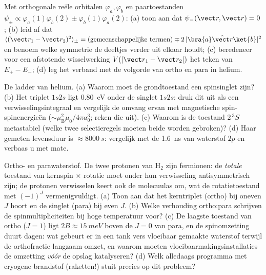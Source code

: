 \begin{exercise}[$\star\star$]\label{exo:b3:identical-particles:6}
Met orthogonale reële orbitalen $\varphi_a, \varphi_b$ en paartoestanden
$\psi_\pm \propto \varphi_a(1)\varphi_b(2) \pm
\varphi_b(1)\varphi_a(2)$: (a) toon aan dat $\psi_-(\vect r, \vect r) = 0$; (b) leid af dat $\langle(\vect r_1 - \vect r_2)^2\rangle_\pm =
(\text{gemeenschappelijke termen}) \mp 2\,|\bra{a}\hat{\vect r}\ket{b}|^2$
en benoem welke symmetrie de deeltjes verder uit elkaar houdt; (c)
beredeneer voor een afstotende wisselwerking $V(|\vect r_1 - \vect r_2|)$
het teken van $E_+ - E_-$; (d) leg het verband met de volgorde van ortho
en para in helium.
\end{exercise}

\begin{exercise}[$\star\star$]\label{exo:b3:identical-particles:7}
De ladder van helium. (a) Waarom moet de grondtoestand een spinsinglet
zijn? (b) Het triplet $1s2s$ ligt \qty{0.80}{eV} onder de singlet $1s2s$:
druk dit uit als een verwisselingsintegraal en vergelijk de omvang ervan
met magnetische spin-spinenergieën ($\sim\mu_{\text{B}}^2\mu_0/4\pi
a_0^3$; reken die uit). (c) Waarom is de toestand $2\,^3S$ metastabiel
(welke twee selectieregels moeten beide worden gebroken)? (d) Haar gemeten
levensduur is $\approx\qty{8000}{s}$: vergelijk met de \qty{1.6}{ns} van
waterstof $2p$ en verbaas u met mate.
\end{exercise}

\begin{exercise}[$\star\star$]\label{exo:b3:identical-particles:8}
Ortho- en parawaterstof. De twee protonen van H$_2$ zijn fermionen: de
\emph{totale} toestand van kernspin $\times$ rotatie moet onder hun
verwisseling antisymmetrisch zijn; de protonen verwisselen keert ook de
molecuulas om, wat de rotatietoestand met $(-1)^J$ vermenigvuldigt. (a)
Toon aan dat het kerntriplet (ortho) bij oneven $J$ hoort en de singlet
(para) bij even $J$. (b) Welke verhouding ortho:para schrijven de
spinmultipliciteiten bij hoge temperatuur voor? (c) De laagste toestand
van ortho ($J = 1$) ligt $2B \approx \qty{15}{meV}$ boven de $J = 0$ van
para, en de spinomzetting duurt dagen: wat gebeurt er in een tank vers
vloeibaar gemaakte waterstof terwijl de orthofractie langzaam omzet, en
waarom moeten vloeibaarmakingsinstallaties de omzetting \emph{vóór} de
opslag katalyseren? (d) Welk alledaags programma met cryogene brandstof
(raketten!) stuit precies op dit probleem?
\end{exercise}

